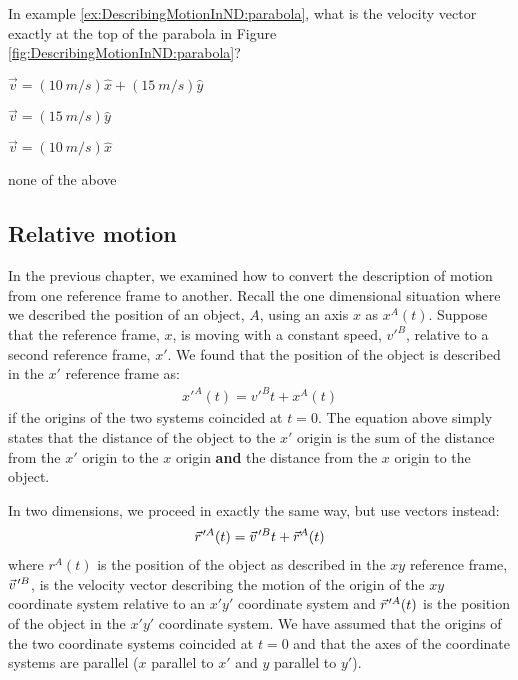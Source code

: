 \begin{checkpoint}{\begin{MCquestion}{In example \ref{ex:DescribingMotionInND:parabola}, what is the velocity vector exactly at the top of the parabola in Figure \ref{fig:DescribingMotionInND:parabola}?}
\item $\vec v=(\SI{10}{m/s})\hat x+(\SI{15}{m/s})\hat y$
\item $\vec v=(\SI{15}{m/s})\hat y$
\item $\vec v=(\SI{10}{m/s})\hat x$ %
\item none of the above
\end{MCquestion}}
\end{checkpoint}

\subsection{Relative motion}
In the previous chapter, we examined how to convert the description of motion from one reference frame to another. Recall the one dimensional situation where we described the position of an object, $A$, using an axis $x$ as $x^A(t)$. Suppose that the reference frame, $x$, is moving with a constant speed, $v'^B$, relative to a second reference frame, $x'$. We found that the position of the object is described in the $x'$ reference frame as:
\begin{align*}
x'^A(t)=v'^Bt+x^A(t)
\end{align*}
if the origins of the two systems coincided at $t=0$. The equation above simply states that the distance of the object to the $x'$ origin is the sum of the distance from the $x'$ origin to the $x$ origin \textbf{and} the distance from the $x$ origin to the object.

In two dimensions, we proceed in exactly the same way, but use vectors instead:
\begin{align*}
\pvec r'^A(t) = \pvec v'^Bt+\vec r^A(t)
\end{align*}
where $r^A(t)$ is the position of the object as described in the $xy$ reference frame, $\pvec v'^B$, is the velocity vector describing the motion of the origin of the $xy$ coordinate system relative to an $x'y'$ coordinate system and $\pvec r'^A(t)$ is the position of the object in the $x'y'$ coordinate system. We have assumed that the origins of the two coordinate systems coincided at $t=0$ and that the axes of the coordinate systems are parallel ($x$ parallel to $x'$ and $y$ parallel to $y'$).

